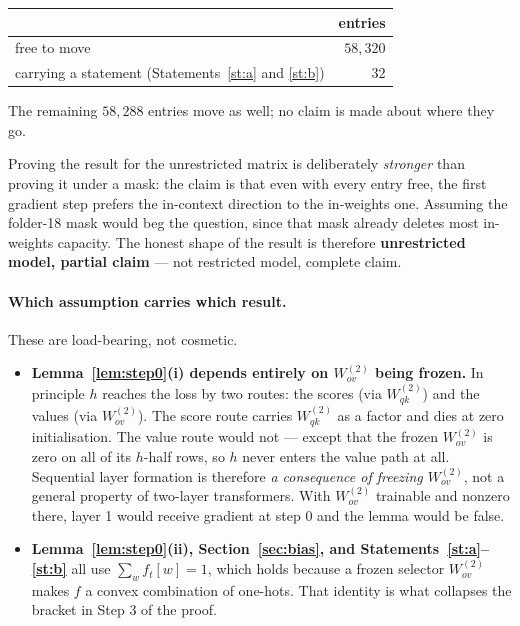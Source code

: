\documentclass[11pt,a4paper]{article}
\theoremstyle{plain}
\theoremstyle{definition}
\newcommand{\1}{\mathbf{1}}
\begin{document}
\begin{center}
\begin{tabular}{@{}lr@{}}
\toprule
 & entries \\
\midrule
free to move & $58{,}320$ \\
carrying a statement (Statements~\ref{st:a} and \ref{st:b}) & $32$ \\
\bottomrule
\end{tabular}
\end{center}

\noindent The remaining $58{,}288$ entries move as well; no claim is made about where they go.

Proving the result for the unrestricted matrix is deliberately \emph{stronger} than proving it
under a mask: the claim is that even with every entry free, the first gradient step prefers the
in-context direction to the in-weights one. Assuming the folder-18 mask would beg the question,
since that mask already deletes most in-weights capacity. The honest shape of the result is
therefore \textbf{unrestricted model, partial claim} --- not restricted model, complete claim.

\paragraph{Which assumption carries which result.}
These are load-bearing, not cosmetic.

\begin{itemize}[nosep]
\item \textbf{Lemma~\ref{lem:step0}(i) depends entirely on $W^{(2)}_{ov}$ being frozen.} In
principle $h$ reaches the loss by two routes: the scores (via $W^{(2)}_{qk}$) and the values (via
$W^{(2)}_{ov}$). The score route carries $W^{(2)}_{qk}$ as a factor and dies at zero
initialisation. The value route would not --- except that the frozen $W^{(2)}_{ov}$ is zero on all
of its $h$-half rows, so $h$ never enters the value path at all. Sequential layer formation is
therefore \emph{a consequence of freezing $W^{(2)}_{ov}$}, not a general property of two-layer
transformers. With $W^{(2)}_{ov}$ trainable and nonzero there, layer 1 would receive gradient at
step $0$ and the lemma would be false.
\item \textbf{Lemma~\ref{lem:step0}(ii), Section~\ref{sec:bias}, and
Statements~\ref{st:a}--\ref{st:b}} all use $\sum_wf_t[w]=1$, which holds because a frozen selector
$W^{(2)}_{ov}$ makes $f$ a convex combination of one-hots. That identity is what collapses the
bracket in Step 3 of the proof.
\end{itemize}
\end{document}
